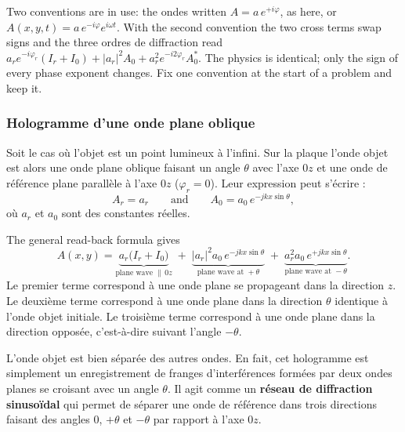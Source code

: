 \begin{remark}
  Two conventions are in use: the ondes written $A = a\,e^{+i\varphi}$, as here,
  or $A(x,y,t) = a\,e^{-i\varphi}e^{i\omega t}$. With the second convention the
  two cross terms swap signs and the three ordres de diffraction read
  $a_r e^{-i\varphi_r}(I_r+I_0) + |a_r|^2 A_0 + a_r^2 e^{-i2\varphi_r}A_0^{*}$.
  The physics is identical; only the sign of every phase exponent changes. Fix
  one convention at the start of a problem and keep it.
\end{remark}

\subsubsection{Hologramme d'une onde plane oblique}
Soit le cas où l'objet est un point lumineux à l'infini. Sur la plaque l'onde
objet est alors une onde plane oblique faisant un angle $\theta$ avec l'axe
$0z$ et une onde de référence plane parallèle à l'axe $0z$
($\varphi_r = 0$). Leur expression peut s'écrire :
\begin{equation*}
  A_r = a_r \qquad\text{and}\qquad A_0 = a_0\,e^{-jkx\sin\theta},
\end{equation*}
où $a_r$ et $a_0$ sont des constantes réelles.

\begin{example}
  The general read-back formula gives
  \begin{equation*}
    A(x,y) = \underbrace{a_r\big(I_r+I_0\big)}_{\text{plane wave }\parallel\, 0z}
    \;+\; \underbrace{|a_r|^2 a_0\, e^{-jkx\sin\theta}}_{\text{plane wave at }+\theta}
    \;+\; \underbrace{a_r^2 a_0\, e^{+jkx\sin\theta}}_{\text{plane wave at }-\theta}.
  \end{equation*}
  Le premier terme correspond à une onde plane se propageant dans la direction
  $z$. Le deuxième terme correspond à une onde plane dans la direction $\theta$
  identique à l'onde objet initiale. Le troisième terme correspond à une onde
  plane dans la direction opposée, c'est-à-dire suivant l'angle $-\theta$.
\end{example}

L'onde objet est bien séparée des autres ondes. En fait, cet hologramme est
simplement un enregistrement de franges d'interférences formées par deux ondes
planes se croisant avec un angle $\theta$. Il agit comme un \textbf{réseau de
diffraction sinusoïdal} qui permet de séparer une onde de référence dans trois
directions faisant des angles $0$, $+\theta$ et $-\theta$ par rapport à l'axe
$0z$.

